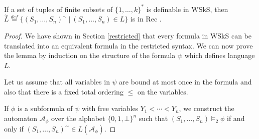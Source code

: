 \begin{lemma}
If a set of tuples of finite subsets of $\{1,\ldots,k\}^*$ is definable in WSkS, then $\overset{\sim}{L} \overset{def}{=} \{(S_1,\ldots,S_n)^\sim\ |\ (S_1,\ldots,S_n) \in L\}$ is in Rec \cite{tata}.
\end{lemma}

\begin{proof}
 We have shown in Section \ref{restricted} that every formula in WSkS can be
 translated into an equivalent formula in the restricted syntax. We can now
 prove the lemma by induction on the structure of the formula $\psi$ which
 defines language $L$.

Let us assume that all variables in $\psi$ are bound at most once in the formula and also that there is a fixed total ordering $\leq$ on the variables.

If $\phi$ is a subformula of $\psi$ with free variables $Y_1 < \cdots < Y_n$, we construct the automaton $\mathcal{A}_\phi$ over the alphabet $\{0,1,\bot\}^n$ such that $(S_1,\ldots,S_n) \vDash_2 \phi$ if and only if $(S_1,\ldots,S_n)^\sim \in L(\mathcal{A}_\phi)$.
\end{proof}

